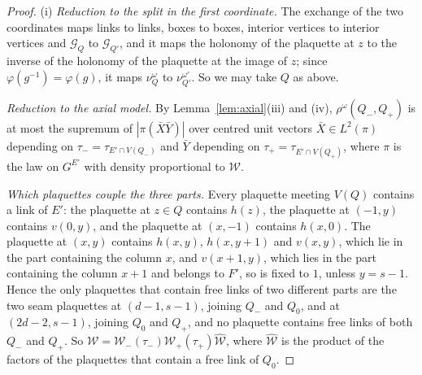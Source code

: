 \begin{proof}
(i) \emph{Reduction to the split in the first coordinate.} The exchange of the
two coordinates maps links to links, boxes to boxes, interior vertices to
interior vertices and $\mathcal G_Q$ to $\mathcal G_{Q'}$, and it maps the
holonomy of the plaquette at $z$ to the inverse of the holonomy of the
plaquette at the image of $z$; since $\varphi(g^{-1})=\varphi(g)$, it maps
$\nu^\omega_Q$ to $\nu^{\omega'}_{Q'}$. So we may take $Q$ as above.

\emph{Reduction to the axial model.} By Lemma~\ref{lem:axial}(iii) and (iv),
$\rho^\omega(Q_-,Q_+)$ is at most the supremum of $|\pi(\bar X\bar Y)|$ over
centred unit vectors $\bar X\in L^2(\pi)$ depending on $\tau_-=\tau_{E'\cap
V(Q_-)}$ and $\bar Y$ depending on $\tau_+=\tau_{E'\cap V(Q_+)}$, where $\pi$ is
the law on $G^{E'}$ with density proportional to $\mathcal W$.

\emph{Which plaquettes couple the three parts.} Every plaquette meeting $V(Q)$
contains a link of $E'$: the plaquette at $z\in Q$ contains $h(z)$, the
plaquette at $(-1,y)$ contains $v(0,y)$, and the plaquette at $(x,-1)$ contains
$h(x,0)$. The plaquette at $(x,y)$ contains $h(x,y)$, $h(x,y+1)$ and $v(x,y)$,
which lie in the part containing the column $x$, and $v(x+1,y)$, which lies in
the part containing the column $x+1$ and belongs to $F'$, so is fixed to $1$,
unless $y=s-1$. Hence the only plaquettes that contain free links of two
different parts are the two seam plaquettes at $(d-1,s-1)$, joining $Q_-$ and
$Q_0$, and at $(2d-2,s-1)$, joining $Q_0$ and $Q_+$, and no plaquette contains
free links of both $Q_-$ and $Q_+$. So $\mathcal W=\mathcal W_-(\tau_-)\mathcal
W_+(\tau_+)\widehat{\mathcal W}$, where $\widehat{\mathcal W}$ is the product of
the factors of the plaquettes that contain a free link of $Q_0$.


\end{proof}
